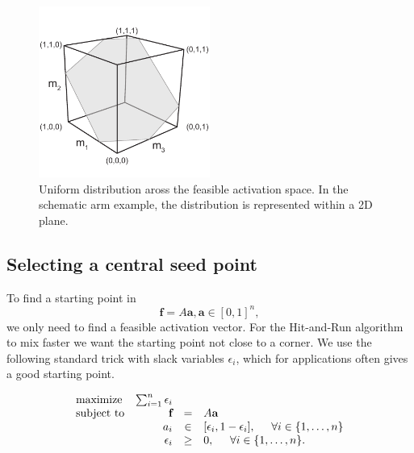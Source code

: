 \begin{figure}[htbp]
\centering
\includegraphics[width=0.5\textwidth,page=9]{sections/figs/HitandRunSchematics_all.pdf}
\caption{Uniform distribution aross the feasible activation space. In the schematic arm example, the distribution is represented within a 2D plane.}
\label{fig:posthitrun_distribution}
\end{figure}



\subsection{Selecting a central seed point}
To find a starting point in 
\[\textbf{f} = A\textbf{a}, \textbf{a} \in [0,1]^n,\]
we only need to find a feasible activation vector. For the Hit-and-Run algorithm to mix faster we want the starting point not close to a corner. %
We use the following standard trick with slack variables $\epsilon_i$, which for applications often gives a good starting point.%

\begin{equation}\label{eq:LP_r}
\begin{array}{lrcl}
\mbox{maximize} & \sum_{i=1}^n \epsilon_i \\ 
\mbox{subject to} & \textbf{f} &=& A\textbf{a}\\
  & a_i &\in& [\epsilon_i, 1- \epsilon_i], \hspace{5mm} \forall i \in \{1,\dots,n\}  \\
  & \epsilon_i &\geq& 0, \hspace{5mm} \forall i \in \{1,\dots,n\}.  
\end{array}
\end{equation}

